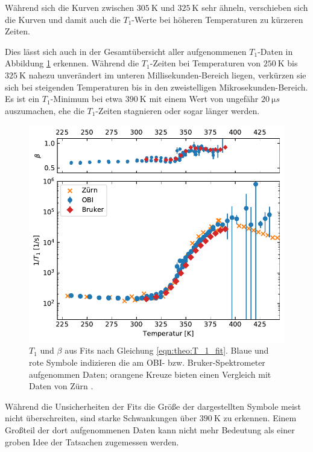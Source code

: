 Während sich die Kurven zwischen $\SI{305}{\kelvin}$ und $\SI{325}{\kelvin}$ sehr ähneln, verschieben sich die Kurven und damit auch die $T_1$-Werte bei höheren Temperaturen zu kürzeren Zeiten.

Dies lässt sich auch in der Gesamtübersicht aller aufgenommenen $T_1$-Daten in Abbildung \ref{fig:res:T_1} erkennen. Während die $T_1$-Zeiten bei Temperaturen von $\SI{250}{\kelvin}$ bis $\SI{325}{\kelvin}$ nahezu unverändert im unteren Millisekunden-Bereich liegen, verkürzen sie sich bei steigenden Temperaturen bis in den zweistelligen Mikrosekunden-Bereich. Es ist ein $T_1$-Minimum bei etwa $\SI{390}{\kelvin}$ mit einem Wert von ungefähr $\SI{20}{\micro s}$ auszumachen, ehe die $T_1$-Zeiten stagnieren oder sogar länger werden.
\begin{figure}
	\begin{center}
		\includegraphics[width=.9\textwidth]{graphics/plot/t1.pdf}
	\end{center}
	\caption{$T_1$ und $\beta$ aus Fits nach Gleichung \eqref{eqn:theo:T_1_fit}. Blaue und rote Symbole indizieren die am OBI- bzw. Bruker-Spektrometer aufgenommen Daten; orangene Kreuze bieten einen Vergleich mit Daten von Zürn \cite{zuern_paper}.} \label{fig:res:T_1}
\end{figure}

Während die Unsicherheiten der Fits die Größe der dargestellten Symbole meist nicht überschreiten, sind starke Schwankungen über $\SI{390}{\kelvin}$ zu erkennen. Einem Großteil der dort aufgenommenen Daten kann nicht mehr Bedeutung als einer groben Idee der Tatsachen zugemessen werden.

